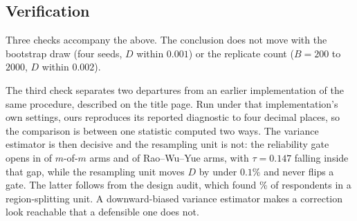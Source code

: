 \subsection{Verification}
Three checks accompany the above. The conclusion does not move with the
bootstrap draw (four seeds, $D$ within $0.001$) or the replicate count
($B=200$ to $2000$, $D$ within $0.002$).

The third check separates two departures from an earlier implementation of the
same procedure, described on the title page. Run under that implementation's own
settings, ours reproduces its reported diagnostic to four decimal places, so the
comparison is between one statistic computed two ways. The variance estimator is then decisive and the resampling unit is
not: the reliability gate opens in \VerMofmOpen{} of \VerMofmN{} $m$-of-$m$ arms
and \VerRwyOpen{} of \VerRwyN{} Rao--Wu--Yue arms, with $\tau=0.147$ falling
inside that gap, while the resampling unit moves $D$ by under
$0.1\%$ and never flips a gate. The latter follows from the design audit, which found
\AudSplitShare\% of respondents in a region-splitting unit. A downward-biased
variance estimator makes a correction look reachable that a defensible one does
not.

